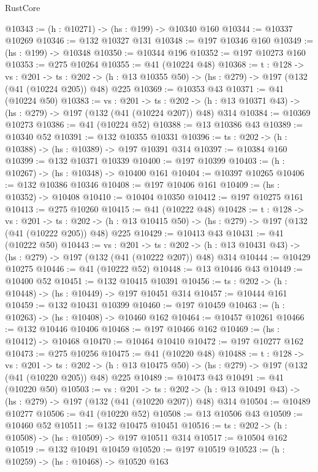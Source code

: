 \begin{lexlean}{RustCore}
\begin{coremodule}
@10343 := (h : @10271) -> (hs : @199) -> @10340 @160
@10344 := @10337 @10269
@10346 := @132 @10327 @131
@10348 := @197 @10346 @160
@10349 := (hs : @199) -> @10348
@10350 := @10344 @196
@10352 := @197 @10273 @160
@10353 := @275 @10264
@10355 := @41 (@10224 @48)
@10368 := {t : @128} ->
  {vs : @201} ->
  {ts : @202} -> (h : @13 @10355 @50) -> (hs : @279) -> @197 (@132 (@41 (@10224 @205)) @48) @225
@10369 := @10353 @43
@10371 := @41 (@10224 @50)
@10383 := {vs : @201} ->
  {ts : @202} -> (h : @13 @10371 @43) -> (hs : @279) -> @197 (@132 (@41 (@10224 @207)) @48) @314
@10384 := @10369 @10273
@10386 := @41 (@10224 @52)
@10388 := @13 @10386 @43
@10389 := @10340 @52
@10391 := @132 @10355 @10331
@10396 := {ts : @202} -> (h : @10388) -> (hs : @10389) -> @197 @10391 @314
@10397 := @10384 @160
@10399 := @132 @10371 @10339
@10400 := @197 @10399
@10403 := (h : @10267) -> (hs : @10348) -> @10400 @161
@10404 := @10397 @10265
@10406 := @132 @10386 @10346
@10408 := @197 @10406 @161
@10409 := (hs : @10352) -> @10408
@10410 := @10404 @10350
@10412 := @197 @10275 @161
@10413 := @275 @10260
@10415 := @41 (@10222 @48)
@10428 := {t : @128} ->
  {vs : @201} ->
  {ts : @202} -> (h : @13 @10415 @50) -> (hs : @279) -> @197 (@132 (@41 (@10222 @205)) @48) @225
@10429 := @10413 @43
@10431 := @41 (@10222 @50)
@10443 := {vs : @201} ->
  {ts : @202} -> (h : @13 @10431 @43) -> (hs : @279) -> @197 (@132 (@41 (@10222 @207)) @48) @314
@10444 := @10429 @10275
@10446 := @41 (@10222 @52)
@10448 := @13 @10446 @43
@10449 := @10400 @52
@10451 := @132 @10415 @10391
@10456 := {ts : @202} -> (h : @10448) -> (hs : @10449) -> @197 @10451 @314
@10457 := @10444 @161
@10459 := @132 @10431 @10399
@10460 := @197 @10459
@10463 := (h : @10263) -> (hs : @10408) -> @10460 @162
@10464 := @10457 @10261
@10466 := @132 @10446 @10406
@10468 := @197 @10466 @162
@10469 := (hs : @10412) -> @10468
@10470 := @10464 @10410
@10472 := @197 @10277 @162
@10473 := @275 @10256
@10475 := @41 (@10220 @48)
@10488 := {t : @128} ->
  {vs : @201} ->
  {ts : @202} -> (h : @13 @10475 @50) -> (hs : @279) -> @197 (@132 (@41 (@10220 @205)) @48) @225
@10489 := @10473 @43
@10491 := @41 (@10220 @50)
@10503 := {vs : @201} ->
  {ts : @202} -> (h : @13 @10491 @43) -> (hs : @279) -> @197 (@132 (@41 (@10220 @207)) @48) @314
@10504 := @10489 @10277
@10506 := @41 (@10220 @52)
@10508 := @13 @10506 @43
@10509 := @10460 @52
@10511 := @132 @10475 @10451
@10516 := {ts : @202} -> (h : @10508) -> (hs : @10509) -> @197 @10511 @314
@10517 := @10504 @162
@10519 := @132 @10491 @10459
@10520 := @197 @10519
@10523 := (h : @10259) -> (hs : @10468) -> @10520 @163

\end{coremodule}
\end{lexlean}
